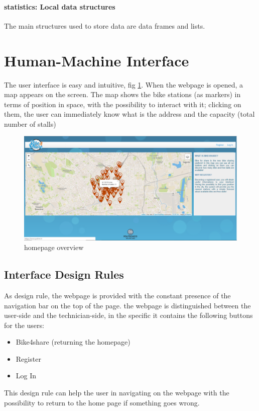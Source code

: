 \documentclass{article}
\begin{document}
\paragraph{statistics: Local data structures}
The main structures used to store data are data frames and lists.

\section{Human-Machine Interface}
The user interface is easy and intuitive, fig \ref{fig:usageb4s}. When the webpage is opened, a map appears on the screen. The map shows the bike stations (as markers) in terms of position in space, with the possibility to interact with it; clicking on them, the user can immediately know what is the address and the capacity (total number of stalls)
\\
\begin{figure}[H]
    \centering
    \includegraphics[width=0.8\linewidth]{image/all.PNG}
    \caption{homepage overview}
    \label{fig:usageb4s}
\end{figure}

\subsection{Interface Design Rules}
As design rule, the webpage is provided with the constant presence of the navigation bar on the top of the page.
the webpage is distinguished between the user-side and the technician-side, in the specific it contains the following buttons for the users:
\begin{itemize}
    \item Bike4share (returning the homepage)
    \item Register
    \item Log In
\end{itemize}
This design rule can help the user in navigating on the webpage with the possibility to return to the home page if something goes wrong.
\end{document}
